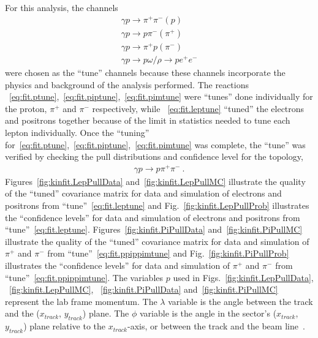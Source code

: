 For this analysis, the channels
\begin{align}
\gamma p \rightarrow \pi^+ \pi^- (p) \label{eq:fit.ptune}\\
\gamma p \rightarrow p \pi^- (\pi^+) \label{eq:fit.piptune}\\
\gamma p \rightarrow \pi^+ p (\pi^-) \label{eq:fit.pimtune}\\
\gamma p \rightarrow p \omega/\rho \rightarrow p e^+ e^- \label{eq:fit.leptune}
\end{align}
%
were chosen as the ``tune'' channels because these channels incorporate the physics and background of the analysis performed. The reactions ~\ref{eq:fit.ptune},~\ref{eq:fit.piptune},~\ref{eq:fit.pimtune} were ``tunes'' done individually for the proton, $\pi^+$ and $\pi^-$ respectively, while ~\ref{eq:fit.leptune} ``tuned'' the electrons and positrons together because of the limit in statistics needed to tune each lepton individually. Once the ``tuning'' for~\ref{eq:fit.ptune},~\ref{eq:fit.piptune},~\ref{eq:fit.pimtune} was complete, the ``tune'' was verified by checking the pull distributions and confidence level for the topology,
\begin{align}
\gamma p \rightarrow p \pi^+ \pi^- \label{eq:fit.ppippimtune} \ .
\end{align}
Figures~\ref{fig:kinfit.LepPullData} and~\ref{fig:kinfit.LepPullMC} illustrate the quality of the ``tuned'' covariance matrix for  data and  simulation of electrons and positrons from ``tune''~\ref{eq:fit.leptune} and Fig.~\ref{fig:kinfit.LepPullProb} illustrates the ``confidence levels'' for  data and simulation of electrons and positrons from ``tune''~\ref{eq:fit.leptune}. Figures~\ref{fig:kinfit.PiPullData} and~\ref{fig:kinfit.PiPullMC} illustrate the quality of the ``tuned'' covariance matrix for  data and  simulation of $\pi^+$ and $\pi^-$ from ``tune''~\ref{eq:fit.ppippimtune} and Fig.~\ref{fig:kinfit.PiPullProb} illustrates the ``confidence levels'' for  data and simulation of $\pi^+$ and $\pi^-$ from ``tune''~\ref{eq:fit.ppippimtune}. The variables $p$ used in Figs.~\ref{fig:kinfit.LepPullData}, ~\ref{fig:kinfit.LepPullMC}, ~\ref{fig:kinfit.PiPullData} and~\ref{fig:kinfit.PiPullMC} represent the lab frame momentum. The $\lambda$ variable is the angle between the track and the ($x_{track}$, $y_{track}$) plane. The $\phi$ variable is the angle in the sector's ($x_{track}$, $y_{track}$) plane relative to the $x_{track}$-axis, or between the track and the beam line~\cite{dustin.kinfit}.


